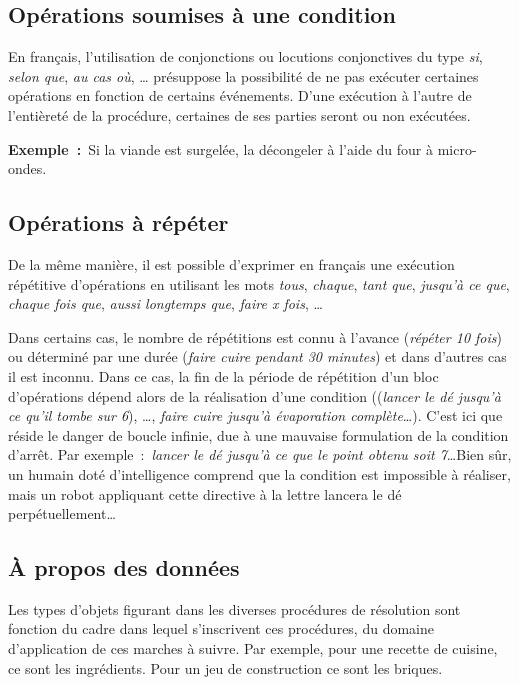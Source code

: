	\subsection{Opérations soumises à une condition}

		En français, l’utilisation de conjonctions ou locutions conjonctives du
		type \textit{si}, \textit{selon que}, \textit{au cas où}, \dots
		présuppose la possibilité de ne pas exécuter certaines opérations en
		fonction de certains événements. D’une exécution à l’autre de
		l’entièreté de la procédure, certaines de ses parties seront ou non
		exécutées.
		
		\textbf{Exemple~:}~Si la viande est surgelée, la décongeler à
		l’aide du four à micro-ondes.

	\subsection{Opérations à répéter}

		De la même manière, il est possible d’exprimer en français une exécution
		répétitive d’opérations en utilisant les mots \textit{tous},
		\textit{chaque}, \textit{tant que}, \textit{jusqu’à ce que},
		\textit{chaque fois que}, \textit{aussi longtemps que}, 
		\textit{faire x fois}, \dots 
		
		Dans certains cas, le nombre de répétitions est connu à l’avance
		(\textit{répéter 10 fois}) ou déterminé par une durée (\textit{faire
		cuire pendant 30 minutes}) et dans d’autres cas il est inconnu.
		Dans ce cas, la fin de la période
		de répétition d’un bloc d’opérations dépend alors de la réalisation
		d’une condition ((\textit{lancer le dé jusqu’à ce
		qu’il tombe sur 6}), \dots, \textit{faire cuire
		jusqu’à évaporation complète}\dots). C’est ici que réside le danger de
		boucle infinie, due à une mauvaise formulation de la condition d’arrêt.
		Par exemple~:~\textit{lancer le dé jusqu’à ce que le point 
		obtenu soit 7}\dots Bien sûr, un humain doté d’intelligence 
		comprend que la condition est impossible à réaliser, mais un robot 
		appliquant cette directive à la lettre lancera le dé 
		perpétuellement\dots

	\subsection{À propos des données}

		Les types d’objets figurant dans les diverses procédures de résolution
		sont fonction du cadre dans lequel s’inscrivent ces procédures, du
		domaine d’application de ces marches à suivre. Par exemple, pour une
		recette de cuisine, ce sont les ingrédients. Pour un jeu de
		construction ce sont les briques.
		

